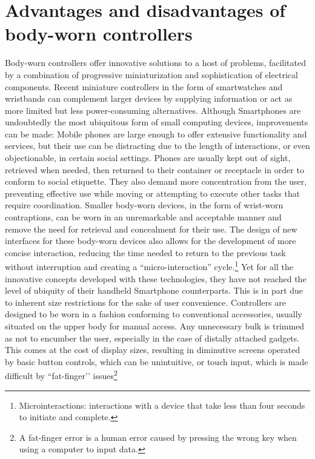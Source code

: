 \documentclass{sigchi}
\begin{document}
\section{Advantages and disadvantages of body-worn controllers}
Body-worn controllers offer innovative solutions to a host of problems, facilitated by a combination of progressive miniaturization and sophistication of electrical components. Recent miniature controllers in the form of smartwatches and wristbands can complement larger devices by supplying information or act as more limited but less power-consuming alternatives. \cite{motion-ui} Although Smartphones are undoubtedly the most ubiquitous form of small computing devices, improvements can be made: Mobile phones are large enough to offer extensive functionality and services, but their use can be distracting due to the length of interactions, or even objectionable, in certain social settings. Phones are usually kept out of sight, retrieved when needed, then returned to their container or receptacle in order to conform to social etiquette. They also demand more concentration from the user, preventing effective use while moving or attempting to execute other tasks that require coordination. Smaller body-worn devices, in the form of wrist-worn contraptions, can be worn in an unremarkable and acceptable manner and remove the need for retrieval and concealment for their use. The design of new interfaces for these body-worn devices also allows for the development of more concise interaction, reducing the time needed to return to the previous task without interruption and creating a ``micro-interaction'' cycle.\footnote{Microinteractions: interactions with a device that take less than four seconds to initiate and complete.} \cite{microinteraction}
Yet for all the innovative concepts developed with these technologies, they have not reached the level of ubiquity of their handheld Smartphone counterparts.
This is in part due to inherent size restrictions for the sake of user convenience. Controllers are designed to be worn in a fashion conforming to conventional accessories, usually situated on the upper body for manual access. Any unnecessary bulk is trimmed as not to encumber the user, especially in the case of distally attached gadgets. This comes at the cost of display sizes, resulting in diminutive screens operated by basic button controls, which can be unintuitive, or touch input, which is made difficult by ``fat-finger’’ issues\footnote{A fat-finger error is a human error caused by pressing the wrong key when using a computer to input data.} %
\end{document}
